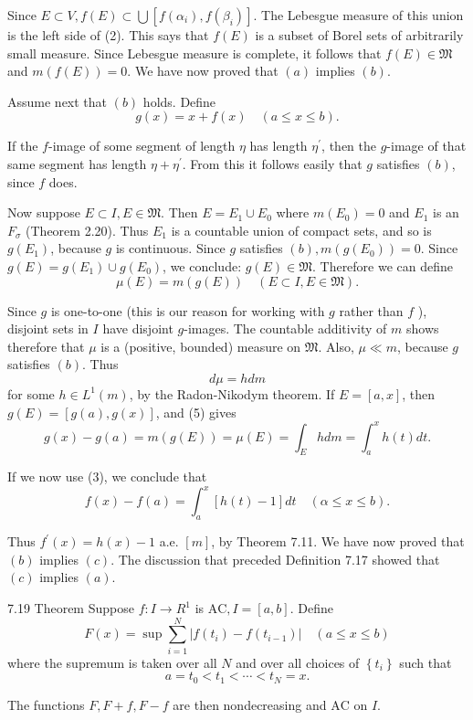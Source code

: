 Since $E \subset V, f(E) \subset \bigcup\left[f\left(\alpha_i\right), f\left(\beta_i\right)\right]$. The Lebesgue measure of this union is the left side of (2). This says that $f(E)$ is a subset of Borel sets of arbitrarily small measure. Since Lebesgue measure is complete, it follows that $f(E) \in \mathfrak{M}$ and $m(f(E))=0$.
We have now proved that $(a)$ implies $(b)$.

Assume next that $(b)$ holds. Define
$$
g(x)=x+f(x) \quad(a \leq x \leq b) .
$$

If the $f$-image of some segment of length $\eta$ has length $\eta^{\prime}$, then the $g$-image of that same segment has length $\eta+\eta^{\prime}$. From this it follows easily that $g$ satisfies $(b)$, since $f$ does.

Now suppose $E \subset I, E \in \mathfrak{M}$. Then $E=E_1 \cup E_0$ where $m\left(E_0\right)=0$ and $E_1$ is an $F_\sigma$ (Theorem 2.20). Thus $E_1$ is a countable union of compact sets, and so is $g\left(E_1\right)$, because $g$ is continuous. Since $g$ satisfies $(b), m\left(g\left(E_0\right)\right)=0$. Since $g(E)=g\left(E_1\right) \cup g\left(E_0\right)$, we conclude: $g(E) \in \mathfrak{M}$.
Therefore we can define
$$
\mu(E)=m(g(E)) \quad(E \subset I, E \in \mathfrak{M}) .
$$

Since $g$ is one-to-one (this is our reason for working with $g$ rather than $f$ ), disjoint sets in $I$ have disjoint $g$-images. The countable additivity of $m$ shows therefore that $\mu$ is a (positive, bounded) measure on $\mathfrak{M}$. Also, $\mu \ll m$, because $g$ satisfies $(b)$. Thus
$$
d \mu=h d m
$$
for some $h \in L^1(m)$, by the Radon-Nikodym theorem.
If $E=[a, x]$, then $g(E)=[g(a), g(x)]$, and (5) gives
$$
g(x)-g(a)=m(g(E))=\mu(E)=\int_E h d m=\int_a^x h(t) d t .
$$

If we now use (3), we conclude that
$$
f(x)-f(a)=\int_a^x[h(t)-1] d t \quad(\alpha \leq x \leq b) .
$$

Thus $f^{\prime}(x)=h(x)-1$ a.e. $[m]$, by Theorem 7.11.
We have now proved that $(b)$ implies $(c)$.
The discussion that preceded Definition 7.17 showed that $(c)$ implies $(a)$.

7.19 Theorem Suppose $f: I \rightarrow R^1$ is $\mathrm{AC}, I=[a, b]$. Define
$$
F(x)=\sup \sum_{i=1}^N\left|f\left(t_i\right)-f\left(t_{i-1}\right)\right| \quad(a \leq x \leq b)
$$
where the supremum is taken over all $N$ and over all choices of $\left\{t_i\right\}$ such that
$$
a=t_0<t_1<\cdots<t_N=x .
$$

The functions $F, F+f, F-f$ are then nondecreasing and $\mathrm{AC}$ on $I$.

